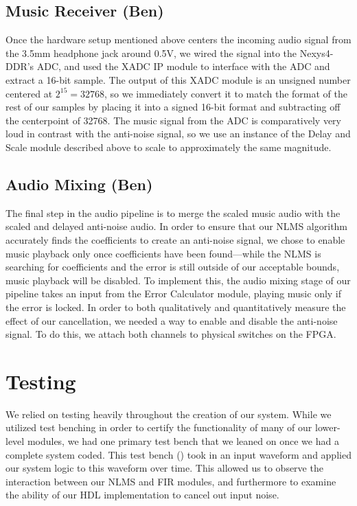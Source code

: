 \documentclass{fpgairpods}
\begin{document}
\subsection{Music Receiver (Ben)}
Once the hardware setup mentioned above centers the incoming audio signal from the 3.5mm headphone jack around 0.5V, we wired the signal into the Nexys4-DDR's ADC, and used the XADC IP module to interface with the ADC and extract a 16-bit sample. The output of this XADC module is an unsigned number centered at $2^{15} = 32768$, so we immediately convert it to match the format of the rest of our samples by placing it into a signed 16-bit format and subtracting off the centerpoint of 32768. The music signal from the ADC is comparatively very loud in contrast with the anti-noise signal, so we use an instance of the Delay and Scale module described above to scale to approximately the same magnitude.

\subsection{Audio Mixing (Ben)}
The final step in the audio pipeline is to merge the scaled music audio with the scaled and delayed anti-noise audio. In order to ensure that our NLMS algorithm accurately finds the coefficients to create an anti-noise signal, we chose to enable music playback only once coefficients have been found---while the NLMS is searching for coefficients and the error is still outside of our acceptable bounds, music playback will be disabled. To implement this, the audio mixing stage of our pipeline takes an input from the Error Calculator module, playing music only if the error is locked. In order to both qualitatively and quantitatively measure the effect of our cancellation, we needed a way to enable and disable the anti-noise signal. To do this, we attach both channels to physical switches on the FPGA.

\section{Testing}
We relied on testing heavily throughout the creation of our system. While we utilized test benching in order to certify the functionality of many of our lower-level modules, we had one primary test bench that we leaned on once we had a complete system coded. This test bench () took in an input waveform and applied our system logic to this waveform over time. This allowed us to observe the interaction between our NLMS and FIR modules, and furthermore to examine the ability of our HDL implementation to cancel out input noise.
\end{document}
